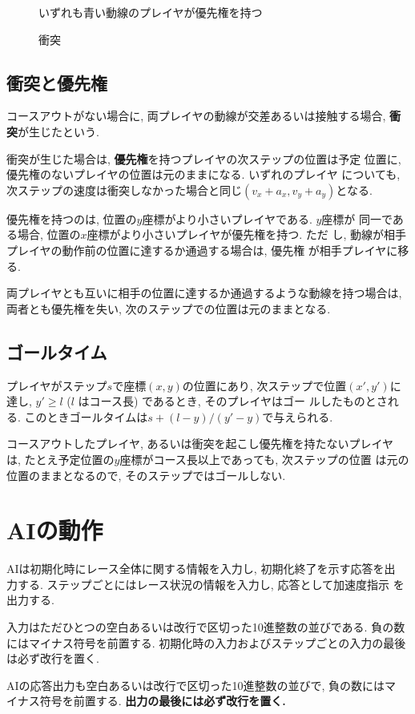 \documentclass[11pt]{jarticle}
\begin{document}
\begin{figure}
  \caption{衝突}
  \label{fig:collision}
  いずれも青い動線のプレイヤが優先権を持つ
  \vspace{-1.5cm}
\end{figure}

\subsection{衝突と優先権}
コースアウトがない場合に, 両プレイヤの動線が交差あるいは接触する場合,
{\bf 衝突}が生じたという.

衝突が生じた場合は, {\bf 優先権}を持つプレイヤの次ステップの位置は予定
位置に, 優先権のないプレイヤの位置は元のままになる.  いずれのプレイヤ
についても, 次ステップの速度は衝突しなかった場合と同じ$(v_x+a_x,
v_y+a_y)$となる.

優先権を持つのは, 位置の$y$座標がより小さいプレイヤである.  $y$座標が
同一である場合, 位置の$x$座標がより小さいプレイヤが優先権を持つ. ただ
し, 動線が相手プレイヤの動作前の位置に達するか通過する場合は, 優先権
が相手プレイヤに移る.

両プレイヤとも互いに相手の位置に達するか通過するような動線を持つ場合は,
両者とも優先権を失い, 次のステップでの位置は元のままとなる.

\subsection{ゴールタイム}
プレイヤがステップ$s$で座標$(x, y)$の位置にあり, 次ステップで位置$(x',
y')$に達し, $y'\ge l$ ($l$ はコース長) であるとき, そのプレイヤはゴー
ルしたものとされる.  このときゴールタイムは$s + (l-y)/(y'-y)$で与えられる.

コースアウトしたプレイヤ, あるいは衝突を起こし優先権を持たないプレイヤ
は, たとえ予定位置の$y$座標がコース長以上であっても, 次ステップの位置
は元の位置のままとなるので, そのステップではゴールしない.

\section{AIの動作}
AIは初期化時にレース全体に関する情報を入力し, 初期化終了を示す応答を出
力する. ステップごとにはレース状況の情報を入力し, 応答として加速度指示
を出力する.

入力はただひとつの空白あるいは改行で区切った10進整数の並びである.
負の数にはマイナス符号を前置する.
初期化時の入力およびステップごとの入力の最後は必ず改行を置く.

AIの応答出力も空白あるいは改行で区切った10進整数の並びで, 負の数にはマ
イナス符号を前置する.  {\bf 出力の最後には必ず改行を置く.}
\end{document}
